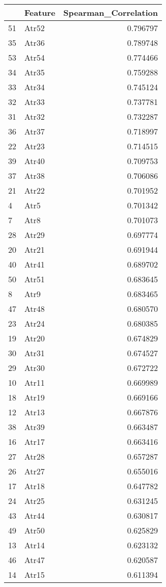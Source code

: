 \begin{tabular}{llr}
\toprule
 & Feature & Spearman_Correlation \\
\midrule
51 & Atr52 & 0.796797 \\
35 & Atr36 & 0.789748 \\
53 & Atr54 & 0.774466 \\
34 & Atr35 & 0.759288 \\
33 & Atr34 & 0.745124 \\
32 & Atr33 & 0.737781 \\
31 & Atr32 & 0.732287 \\
36 & Atr37 & 0.718997 \\
22 & Atr23 & 0.714515 \\
39 & Atr40 & 0.709753 \\
37 & Atr38 & 0.706086 \\
21 & Atr22 & 0.701952 \\
4 & Atr5 & 0.701342 \\
7 & Atr8 & 0.701073 \\
28 & Atr29 & 0.697774 \\
20 & Atr21 & 0.691944 \\
40 & Atr41 & 0.689702 \\
50 & Atr51 & 0.683645 \\
8 & Atr9 & 0.683465 \\
47 & Atr48 & 0.680570 \\
23 & Atr24 & 0.680385 \\
19 & Atr20 & 0.674829 \\
30 & Atr31 & 0.674527 \\
29 & Atr30 & 0.672722 \\
10 & Atr11 & 0.669989 \\
18 & Atr19 & 0.669166 \\
12 & Atr13 & 0.667876 \\
38 & Atr39 & 0.663487 \\
16 & Atr17 & 0.663416 \\
27 & Atr28 & 0.657287 \\
26 & Atr27 & 0.655016 \\
17 & Atr18 & 0.647782 \\
24 & Atr25 & 0.631245 \\
43 & Atr44 & 0.630817 \\
49 & Atr50 & 0.625829 \\
13 & Atr14 & 0.623132 \\
46 & Atr47 & 0.620587 \\
14 & Atr15 & 0.611394 \\

\end{tabular}

